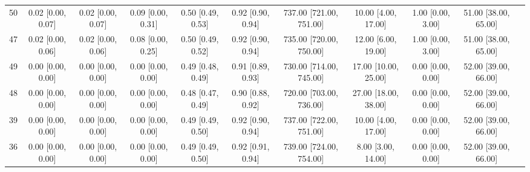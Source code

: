 \documentclass[8pt]{article}
\begin{document}
\begin{center}
\begin{footnotesize}
\begin{longtable}{|ccccccccccc|}
 50 &  0.02 [0.00, 0.07] &  0.02 [0.00, 0.07] &  0.09 [0.00, 0.31] &  0.50 [0.49, 0.53] &  0.92 [0.90, 0.94] &  737.00 [721.00, 751.00] &      10.00 [4.00, 17.00] &     1.00 [0.00, 3.00] &  51.00 [38.00, 65.00] \\
 47 &  0.02 [0.00, 0.06] &  0.02 [0.00, 0.06] &  0.08 [0.00, 0.25] &  0.50 [0.49, 0.52] &  0.92 [0.90, 0.94] &  735.00 [720.00, 750.00] &      12.00 [6.00, 19.00] &     1.00 [0.00, 3.00] &  51.00 [38.00, 65.00] \\
 49 &  0.00 [0.00, 0.00] &  0.00 [0.00, 0.00] &  0.00 [0.00, 0.00] &  0.49 [0.48, 0.49] &  0.91 [0.89, 0.93] &  730.00 [714.00, 745.00] &     17.00 [10.00, 25.00] &     0.00 [0.00, 0.00] &  52.00 [39.00, 66.00] \\
 48 &  0.00 [0.00, 0.00] &  0.00 [0.00, 0.00] &  0.00 [0.00, 0.00] &  0.48 [0.47, 0.49] &  0.90 [0.88, 0.92] &  720.00 [703.00, 736.00] &     27.00 [18.00, 38.00] &     0.00 [0.00, 0.00] &  52.00 [39.00, 66.00] \\
 39 &  0.00 [0.00, 0.00] &  0.00 [0.00, 0.00] &  0.00 [0.00, 0.00] &  0.49 [0.49, 0.50] &  0.92 [0.90, 0.94] &  737.00 [722.00, 751.00] &      10.00 [4.00, 17.00] &     0.00 [0.00, 0.00] &  52.00 [39.00, 66.00] \\
 36 &  0.00 [0.00, 0.00] &  0.00 [0.00, 0.00] &  0.00 [0.00, 0.00] &  0.49 [0.49, 0.50] &  0.92 [0.91, 0.94] &  739.00 [724.00, 754.00] &       8.00 [3.00, 14.00] &     0.00 [0.00, 0.00] &  52.00 [39.00, 66.00] \\
\end{longtable}
\end{footnotesize}
\end{center}
\end{document}
